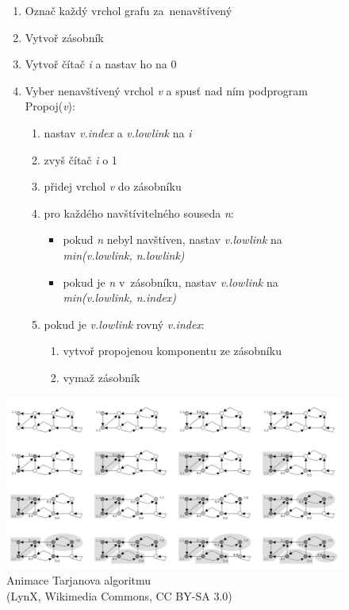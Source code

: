 \begin{figure}[ht]
\onehalfspacing
\begin{enumerate}
\item Označ každý vrchol grafu za~nenavštívený
\item Vytvoř zásobník
\item Vytvoř čítač \emph{i} a nastav ho na 0
\item Vyber nenavštívený vrchol \emph{v} a spusť nad ním podprogram Propoj(\emph{v}):
    \begin{enumerate}
    \item nastav \emph{v.index} a \emph{v.lowlink} na \emph{i}
    \item zvyš čítač \emph{i} o 1
    \item přidej vrchol \emph{v} do zásobníku
    \item pro každého navštívitelného souseda \emph{n}:
        \begin{itemize}
        \item pokud \emph{n} nebyl navštíven, nastav \emph{v.lowlink} na \emph{min(v.lowlink, n.lowlink)}
        \item pokud je \emph{n} v~zásobníku, nastav \emph{v.lowlink} na \emph{min(v.lowlink, n.index)}
        \end{itemize}
    \item pokud je \emph{v.lowlink} rovný \emph{v.index}:
        \begin{enumerate}
        \item vytvoř propojenou komponentu ze zásobníku
        \item vymaž zásobník
        \end{enumerate}
    \end{enumerate}
\end{enumerate}
\end{figure}
\FloatBarrier

\begin{figure}[ht]
\centering
\includegraphics[width=\textwidth]{images/3_tarjanuv-algoritmus-animace.png}

\caption[Animace Tarjanova algoritmu]{Animace Tarjanova algoritmu\\{\small (LynX, Wikimedia Commons, CC BY-SA 3.0)}}
\end{figure}

